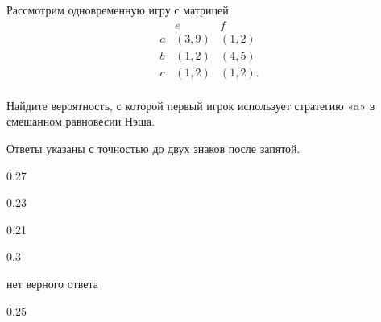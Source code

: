 
\begin{question}
Рассмотрим одновременную игру с матрицей \[
\begin{matrix}
   & e & f \\
a  & (3, 9) & (1, 2) \\
b  & (1, 2) & (4, 5) \\
c  & (1, 2) & (1, 2). \\
\end{matrix}
\]

Найдите вероятность, с которой первый игрок использует стратегию «a» в
смешанном равновесии Нэша.

Ответы указаны с точностью до двух знаков после запятой.
\begin{answerlist}
  \item 0.27
  \item 0.23
  \item 0.21
  \item 0.3
  \item нет верного ответа
  \item 0.25
\end{answerlist}
\end{question}


